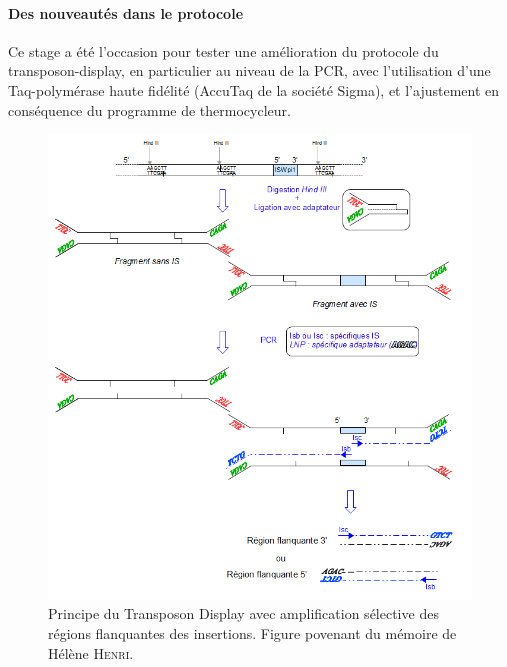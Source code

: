 	\paragraph{Des nouveautés dans le protocole} %
	\label{par:protocole2}
	Ce stage a été l’occasion pour tester une amélioration du protocole du transposon-display, en particulier au niveau de la PCR, avec l’utilisation d’une Taq-polymérase haute fidélité (AccuTaq de la société Sigma), et l’ajustement en conséquence du programme de thermocycleur.

\begin{figure}[h!]
	\begin{center}
		\includegraphics[width=160mm]{tdisplay.png}
	\end{center}
	\caption{Principe du Transposon Display avec amplification sélective des régions
flanquantes des insertions. Figure povenant du mémoire de Hélène \textsc{Henri}\cite{memHH}.%
	}
	\label{fig:figure1}
\end{figure}

